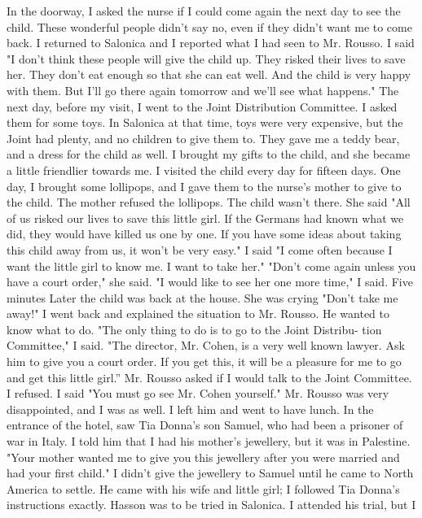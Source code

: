 In the doorway, I asked the nurse 
if I could come again the next day to see the child.
These wonderful 
people didn't say no, even if they didn't want me to come back.
I returned to Salonica and I reported what I had seen to Mr.
Rousso.
I said "I don't think these people will give the child up.
They risked 
their lives to save her.
They don't eat enough so that she can eat well.
And the child is very happy with them.
But I'll go there again tomorrow 
and we'll see what happens."
The next day, before my visit, I went to the Joint Distribution 
Committee.
I asked them for some toys.
In Salonica at that time, toys 
were very expensive, but the Joint had plenty, and no children to give 
them to.
They gave me a teddy bear, and a dress for the child as well.
I brought my gifts to the child, and she became a little friendlier towards me.
I visited the child every day for fifteen days.
One day, I brought 
some lollipops, and I gave them to the nurse's mother to give to the 
child.
The mother refused the lollipops.
The child wasn't there.
She 
said "All of us risked our lives to save this little girl.
If the Germans had known what we did, they would have killed us one by one.
If you 
have some ideas about taking this child away from us, it won't be very 
easy."
I said "I come often because I want the little girl to know me.
I 
want to take her."
"Don't come again unless you have a court order," she said.
"I would like to see her one more time," I said.
Five minutes Later 
the child was back at the house.
She was crying "Don't take me away!"
I went back and explained the situation to Mr.
Rousso.
He wanted to 
know what to do.
"The only thing to do is to go to the Joint Distribu-
tion Committee," I said.
"The director, Mr.
Cohen, is a very well known 
lawyer.
Ask him to give you a court order.
If you get this, it will be 
a pleasure for me to go and get this little girl.” Mr.
Rousso asked
if I would talk to the Joint Committee.
I refused.
I said "You must 
go see Mr.
Cohen yourself."
Mr.
Rousso was very disappointed, and I was 
as well.
I left him and went to have lunch.
In the entrance of the hotel, 
saw Tia Donna's son Samuel, who had been a prisoner of war in Italy.
I 
told him that I had his mother's jewellery, but it was in Palestine.
"Your mother wanted me to give you this jewellery after you were married 
and had your first child."
I didn't give the jewellery to Samuel until 
he came to North America to settle.
He came with his wife and little 
girl; I followed Tia Donna's instructions exactly.
Hasson was to be tried in Salonica.
I attended his trial, but I 
